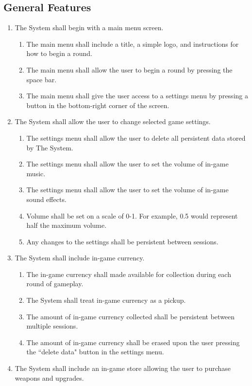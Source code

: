 \documentclass[12pt]{report}
\newenvironment{reqlist}{
	\renewcommand{\labelenumi}{\tab\thesubsection.\arabic{enumi}}
	\renewcommand{\labelenumii}{\thesubsection.\arabic{enumi}.\arabic{enumii}}
	\begin{enumerate}[itemsep = 1pt, parsep = 0pt, leftmargin = *]
}{\end{enumerate}}
\begin{document}
	\subsection{General Features}
		\begin{reqlist}
			\item The System shall begin with a main menu screen.
			\begin{reqlist}
				\item The main menu shall include a title, a simple logo, and instructions for how to begin a round.
				\item The main menu shall allow the user to begin a round by pressing the space bar.
				\item The main menu shall give the user access to a settings menu by pressing a button in the bottom-right corner of the screen.
			\end{reqlist}
			\item The System shall allow the user to change selected game settings.
			\begin{reqlist}
				\item The settings menu shall allow the user to delete all persistent data stored by The System.
				\item The settings menu shall allow the user to set the volume of in-game music.
				\item The settings menu shall allow the user to set the volume of in-game sound effects.
				\item Volume shall be set on a scale of 0-1. For example, 0.5 would represent half the maximum volume.
				\item Any changes to the settings shall be persistent between sessions.
			\end{reqlist}
			\item The System shall include in-game currency.
			\begin{reqlist}
				\item The in-game currency shall made available for collection during each round of gameplay.
				\item The System shall treat in-game currency as a pickup.
				\item The amount of in-game currency collected shall be persistent between multiple sessions.
				\item The amount of in-game currency shall be erased upon the user pressing the ``delete data" button in the settings menu.
			\end{reqlist}
			\item The System shall include an in-game store allowing the user to purchase weapons and upgrades.

\end{reqlist}
\end{document}
